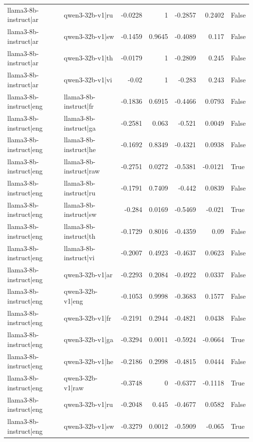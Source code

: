 \begin{table}
\begin{tabular}{l l r r r r l}
llama3-8b-instruct|ar & qwen3-32b-v1|ru & -0.0228 & 1 & -0.2857 & 0.2402 & False \\
llama3-8b-instruct|ar & qwen3-32b-v1|sw & -0.1459 & 0.9645 & -0.4089 & 0.117 & False \\
llama3-8b-instruct|ar & qwen3-32b-v1|th & -0.0179 & 1 & -0.2809 & 0.245 & False \\
llama3-8b-instruct|ar & qwen3-32b-v1|vi & -0.02 & 1 & -0.283 & 0.243 & False \\
llama3-8b-instruct|eng & llama3-8b-instruct|fr & -0.1836 & 0.6915 & -0.4466 & 0.0793 & False \\
llama3-8b-instruct|eng & llama3-8b-instruct|ga & -0.2581 & 0.063 & -0.521 & 0.0049 & False \\
llama3-8b-instruct|eng & llama3-8b-instruct|he & -0.1692 & 0.8349 & -0.4321 & 0.0938 & False \\
llama3-8b-instruct|eng & llama3-8b-instruct|raw & -0.2751 & 0.0272 & -0.5381 & -0.0121 & True \\
llama3-8b-instruct|eng & llama3-8b-instruct|ru & -0.1791 & 0.7409 & -0.442 & 0.0839 & False \\
llama3-8b-instruct|eng & llama3-8b-instruct|sw & -0.284 & 0.0169 & -0.5469 & -0.021 & True \\
llama3-8b-instruct|eng & llama3-8b-instruct|th & -0.1729 & 0.8016 & -0.4359 & 0.09 & False \\
llama3-8b-instruct|eng & llama3-8b-instruct|vi & -0.2007 & 0.4923 & -0.4637 & 0.0623 & False \\
llama3-8b-instruct|eng & qwen3-32b-v1|ar & -0.2293 & 0.2084 & -0.4922 & 0.0337 & False \\
llama3-8b-instruct|eng & qwen3-32b-v1|eng & -0.1053 & 0.9998 & -0.3683 & 0.1577 & False \\
llama3-8b-instruct|eng & qwen3-32b-v1|fr & -0.2191 & 0.2944 & -0.4821 & 0.0438 & False \\
llama3-8b-instruct|eng & qwen3-32b-v1|ga & -0.3294 & 0.0011 & -0.5924 & -0.0664 & True \\
llama3-8b-instruct|eng & qwen3-32b-v1|he & -0.2186 & 0.2998 & -0.4815 & 0.0444 & False \\
llama3-8b-instruct|eng & qwen3-32b-v1|raw & -0.3748 & 0 & -0.6377 & -0.1118 & True \\
llama3-8b-instruct|eng & qwen3-32b-v1|ru & -0.2048 & 0.445 & -0.4677 & 0.0582 & False \\
llama3-8b-instruct|eng & qwen3-32b-v1|sw & -0.3279 & 0.0012 & -0.5909 & -0.065 & True \\

\end{tabular}
\end{table}
